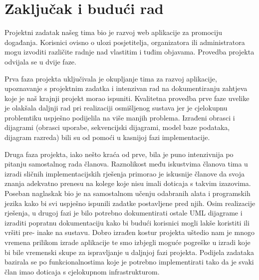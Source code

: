 \chapter{Zaključak i budući rad}
		
		
		
Projektni zadatak našeg tima bio je razvoj web aplikacije za promociju događanja. Korisnici ovisno o ulozi posjetitelja, organizatora ili administratora mogu izvoditi različite radnje nad vlastitim i tuđim objavama. Provedba projekta odvijala se u dvije faze. 

Prva faza projekta uključivala je okupljanje tima za razvoj aplikacije, upoznavanje s
projektnim zadatka i intenzivan rad na dokumentiranju zahtjeva koje je naš krajnji projekt morao ispuniti. Kvalitetna provedba prve faze uvelike je olakšala daljnji rad pri realizaciji osmišljenog sustava jer je cjelokupnu problemtiku uspješno podijelila na više manjih problema.
Izrađeni obrasci i dijagrami (obrasci uporabe, sekvencijski dijagrami, model baze
podataka, dijagram razreda) bili su od pomoći u kasnijoj fazi implementacije. 

Druga faza projekta, iako nešto kraća od prve, bila je puno intenzivnija po pitanju samostalnog rada članova. Raznolikost među iskustvima članova tima u izradi sličnih implementacijskih rješenja primorao je iskusnije članove da svoja znanja adekvatno prenesu na kolege koje nisu imali doticaja s takvim izazovima. Poseban naglaskak bio je na samostalnom učenju odabranih alata i
programskih jezika kako bi svi uspješno ispunili zadatke postavljene pred njih. Osim realizacije rješenja,
u drugoj fazi je bilo potrebno dokumentirati ostale UML dijagrame i izraditi popratnu dokumentaciju kako bi budući korisnici mogli lakše koristiti ili vršiti pre-
inake na sustavu. Dobro izrađen kostur projekta uštedio nam je mnogo vremena
prilikom izrade aplikacije te smo izbjegli moguće pogreške u izradi koje bi bile
vremenski skupe za ispravljanje u daljnjoj fazi projekta. Podijela zadataka bazirala se po funkcionalnostima koje je potrebno implementirati tako da je svaki član imao doticaja s cjelokupnom infrastrukturom.

